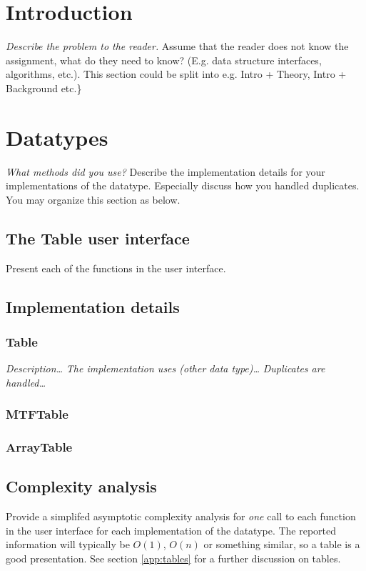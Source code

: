 \documentclass[10pt, titlepage, oneside, a4paper]{article}
\begin{document}
\section{Introduction}
\label{sec:intro}

\emph{Describe the problem to the reader.} Assume that the reader does not
know the assignment, what do they need to know? (E.g. data structure
interfaces, algorithms, etc.). This section could be split into e.g.
Intro + Theory, Intro + Background etc.\}

\section{Datatypes}
\label{sec:datatypes}
\emph{What methods did you use?} Describe the implementation details for
your implementations of the datatype. Especially discuss how you
handled duplicates. You may organize this section as below.

\subsection{The Table user interface}
\label{sec:orgaade8d0}

Present each of the functions in the user interface.

\subsection{Implementation details}
\label{sec:org9d7104b}

\subsubsection{Table}
\label{sec:org315d8fa}

\emph{Description\ldots{}} \emph{The implementation uses (other data type)\ldots{}} \emph{Duplicates are handled\ldots{}}

\subsubsection{MTFTable}
\label{sec:orgc3e1dd9}

\subsubsection{ArrayTable}
\label{sec:org7b4e5fb}

\subsection{Complexity analysis}
\label{sec:complexity}
Provide a simplifed asymptotic complexity analysis for \emph{one} call to
each function in the user interface for each implementation of the
datatype. The reported information will typically be \(O(1)\), \(O(n)\) or
something similar, so a table is a good presentation. See section
\ref{app:tables} for a further discussion on tables.
\end{document}
